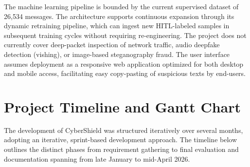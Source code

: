The machine learning pipeline is bounded by the current supervised dataset of 26,534 messages. The architecture supports continuous expansion through its dynamic retraining pipeline, which can ingest new HITL-labeled samples in subsequent training cycles without requiring re-engineering. The project does not currently cover deep-packet inspection of network traffic, audio deepfake detection (vishing), or image-based steganography fraud. The user interface assumes deployment as a responsive web application optimized for both desktop and mobile access, facilitating easy copy-pasting of suspicious texts by end-users.

\section{Project Timeline and Gantt Chart}
The development of CyberShield was structured iteratively over several months, adopting an iterative, sprint-based development approach. The timeline below outlines the distinct phases from requirement gathering to final evaluation and documentation spanning from late January to mid-April 2026.

